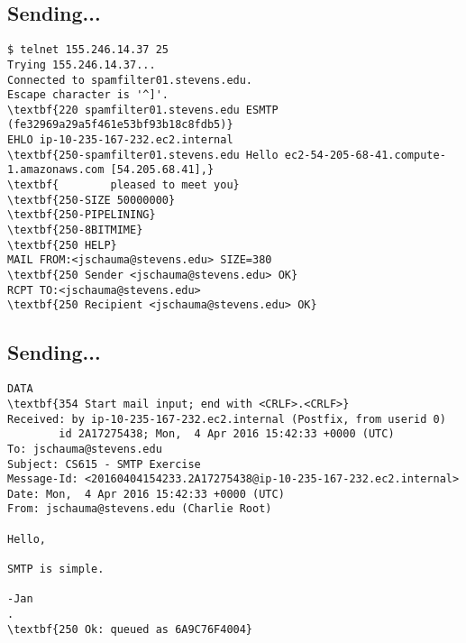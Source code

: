 \documentclass[xga]{xdvislides}
\begin{document}
\subsection{Sending...}
\begin{Verbatim}
$ telnet 155.246.14.37 25
Trying 155.246.14.37...
Connected to spamfilter01.stevens.edu.
Escape character is '^]'.
\textbf{220 spamfilter01.stevens.edu ESMTP (fe32969a29a5f461e53bf93b18c8fdb5)}
EHLO ip-10-235-167-232.ec2.internal
\textbf{250-spamfilter01.stevens.edu Hello ec2-54-205-68-41.compute-1.amazonaws.com [54.205.68.41],}
\textbf{        pleased to meet you}
\textbf{250-SIZE 50000000}
\textbf{250-PIPELINING}
\textbf{250-8BITMIME}
\textbf{250 HELP}
MAIL FROM:<jschauma@stevens.edu> SIZE=380
\textbf{250 Sender <jschauma@stevens.edu> OK}
RCPT TO:<jschauma@stevens.edu>
\textbf{250 Recipient <jschauma@stevens.edu> OK}
\end{Verbatim}

\subsection{Sending...}
\begin{Verbatim}
DATA
\textbf{354 Start mail input; end with <CRLF>.<CRLF>}
Received: by ip-10-235-167-232.ec2.internal (Postfix, from userid 0)
        id 2A17275438; Mon,  4 Apr 2016 15:42:33 +0000 (UTC)
To: jschauma@stevens.edu
Subject: CS615 - SMTP Exercise
Message-Id: <20160404154233.2A17275438@ip-10-235-167-232.ec2.internal>
Date: Mon,  4 Apr 2016 15:42:33 +0000 (UTC)
From: jschauma@stevens.edu (Charlie Root)

Hello,

SMTP is simple.

-Jan
.
\textbf{250 Ok: queued as 6A9C76F4004}
\end{Verbatim}
\end{document}
